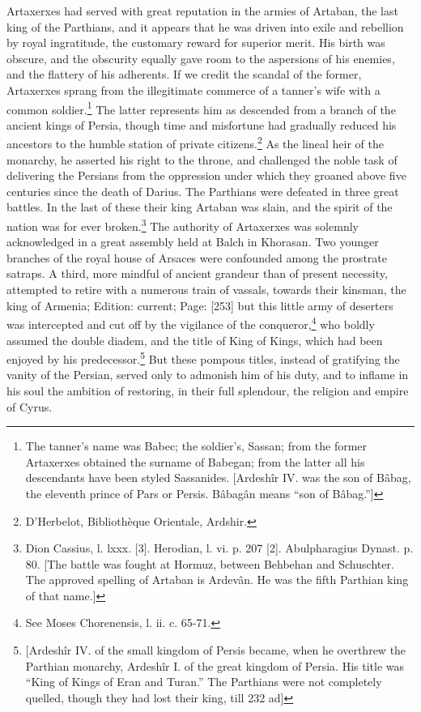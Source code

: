 Artaxerxes had served with great reputation in the armies of Artaban, the last king of the Parthians, and it appears that he was driven into exile and rebellion by royal ingratitude, the customary reward for superior merit. His birth was obscure, and the obscurity equally gave room to the aspersions of his enemies, and the flattery of his adherents. If we credit the scandal of the former, Artaxerxes sprang from the illegitimate commerce of a tanner\texthebrew{}’s wife with a common soldier.\footnote{The tanner\texthebrew{}’s name was Babec; the soldier\texthebrew{}’s, Sassan; from the former Artaxerxes obtained the surname of Babegan; from the latter all his descendants have been styled Sassanides. [Ardeshîr IV. was the son of Bâbag, the eleventh prince of Pars or Persis. Bâbagân means \texthebrew{“}son of Bâbag.\texthebrew{}”]} The latter represents him as descended from a branch of the ancient kings of Persia, though time and misfortune had gradually reduced his ancestors to the humble station of private citizens.\footnote{D\texthebrew{}’Herbelot, Bibliothèque Orientale, Ardshir.} As the lineal heir of the monarchy, he asserted his right to the throne, and challenged the noble task of delivering the Persians from the oppression under which they groaned above five centuries since the death of Darius. The Parthians were defeated in three great battles. In the last of these their king Artaban was slain, and the spirit of the nation was for ever broken.\footnote{Dion Cassius, l. lxxx. [3]. Herodian, l. vi. p. 207 [2]. Abulpharagius Dynast. p. 80. [The battle was fought at Hormuz, between Behbehan and Schuschter. The approved spelling of Artaban is Ardevân. He was the fifth Parthian king of that name.]} The authority of Artaxerxes was solemnly acknowledged in a great assembly held at Balch in Khorasan. Two younger branches of the royal house of Arsaces were confounded among the prostrate satraps. A third, more mindful of ancient grandeur than of present necessity, attempted to retire with a numerous train of vassals, towards their kinsman, the king of Armenia; Edition: current; Page: [253] but this little army of deserters was intercepted and cut off by the vigilance of the conqueror,\footnote{See Moses Chorenensis, l. ii. c. 65-71.} who boldly assumed the double diadem, and the title of King of Kings, which had been enjoyed by his predecessor.\footnote{[Ardeshîr IV. of the small kingdom of Persis became, when he overthrew the Parthian monarchy, Ardeshîr I. of the great kingdom of Persia. His title was \texthebrew{“}King of Kings of Eran and Turan.\texthebrew{}” The Parthians were not completely quelled, though they had lost their king, till 232 ad]} But these pompous titles, instead of gratifying the vanity of the Persian, served only to admonish him of his duty, and to inflame in his soul the ambition of restoring, in their full splendour, the religion and empire of Cyrus.


